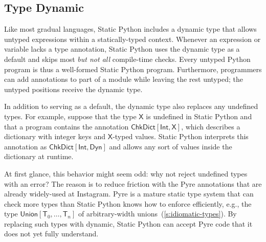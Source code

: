 \documentclass[english,cleveref,submission]{programming}
\newcommand{\SP}{Static Python}
\newcommand{\typefont}[1]{\mathsf{#1}}
\newcommand{\paramtype}[2]{#1[#2]}
\newcommand{\sptype}{\typefont{T}}
\newcommand{\sptX}{\typefont{X}} %
\newcommand{\sptint}{\typefont{Int}}
\newcommand{\sptdyn}{\typefont{Dyn}}
\newcommand{\sptunion}[1]{\paramtype{\typefont{Union}}{#1}}
\newcommand{\sptchkdict}[2]{\paramtype{\typefont{ChkDict}}{#1, #2}}
\begin{document}
\subsection{Type Dynamic}
\label{s:type-dynamic}


Like most gradual languages, \SP{} includes a dynamic type
that allows untyped expressions within a statically-typed context.
Whenever an expression or variable lacks a type annotation, \SP{} uses the
dynamic type as a default and skips most \emph{but not all}\/ compile-time checks.
Every untyped Python program is thus a well-formed \SP{} program.
Furthermore, programmers can add annotations to part of a module
while leaving the rest untyped; the untyped positions receive the dynamic type.

In addition to serving as a default, the dynamic type also replaces any undefined types.
For example, suppose that the type $\sptX{}$ is undefined in \SP{} and that a
program contains the annotation $\sptchkdict{\sptint}{\sptX{}}$, which describes a
dictionary with integer keys and $\sptX{}$-typed values.
\SP{} interprets this annotation as $\sptchkdict{\sptint}{\sptdyn}$ and allows any sort
of values inside the dictionary at runtime.

At first glance, this behavior might seem odd: why not reject undefined types with an error?
The reason is to reduce friction with the Pyre annotations that are already
widely-used at Instagram.
Pyre is a mature static type system that can check more types than \SP{} knows how to enforce
efficiently, e.g., the type $\sptunion{\sptype_0, \ldots, \sptype_n}$ of arbitrary-width unions~(\cref{s:idiomatic-types}).
By replacing such types with dynamic, \SP{} can accept Pyre code that it does not yet fully understand.
\end{document}
